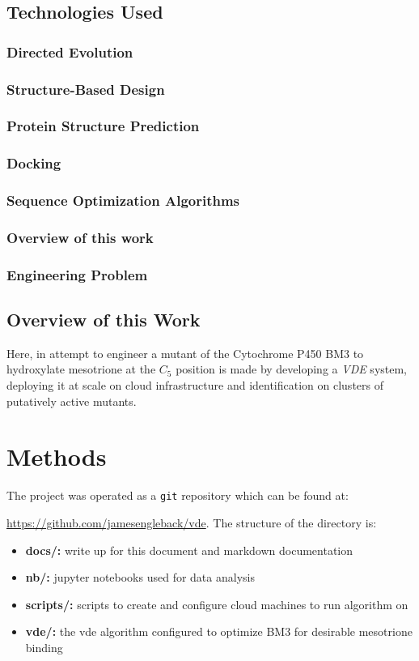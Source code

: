 \documentclass[16pt]{article}
\begin{document}
\subsection{Technologies Used}
\subsubsection{Directed Evolution}
\subsubsection{Structure-Based Design}
\subsubsection{Protein Structure Prediction}
\subsubsection{Docking}
\subsubsection{Sequence Optimization Algorithms}
\subsubsection{Overview of this work}
\subsubsection{Engineering Problem}
\subsection{Overview of this Work}

Here, in attempt to engineer a mutant of the Cytochrome P450 BM3 to hydroxylate mesotrione at the $C_5$ position is made by developing a \textit{VDE} system, deploying it at scale on cloud infrastructure and identification on clusters of putatively active mutants.
\section{Methods}

The project was operated as a  \texttt{git} repository which can be found at:

\href{https://github.com/jamesengleback/vde}{https://github.com/jamesengleback/vde}.
The structure of the directory is:

\begin{itemize}
	\item \textbf{docs/:} write up for this document and markdown documentation
	\item \textbf{nb/:} jupyter notebooks used for data analysis
	\item \textbf{scripts/:} scripts to create and configure cloud machines to run algorithm on
	\item \textbf{vde/:} the vde algorithm configured to optimize BM3 for desirable mesotrione binding
\end{itemize}
\end{document}
